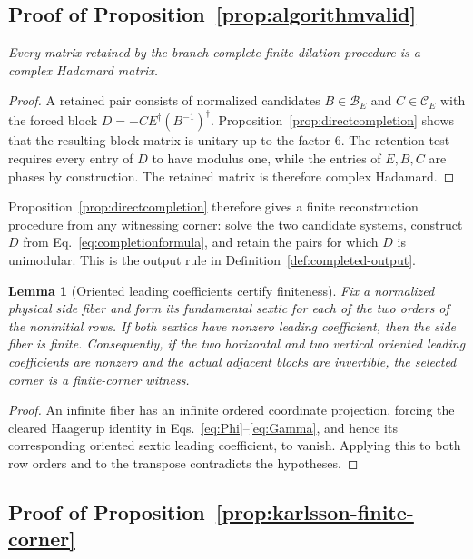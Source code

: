 \documentclass[aps,prx,reprint,nofootinbib,twoside,superscriptaddress,longbibliography,floatfix]{revtex4-2}
\newtheorem{lemma}[theorem]{Lemma}
\theoremstyle{definition}
\begin{document}
\subsection{{Proof of Proposition~\ref{prop:algorithmvalid}}}
{\emph{Every matrix retained by the branch-complete finite-dilation procedure is a complex Hadamard matrix.}}

\begin{proof}
{A retained pair consists of normalized candidates $B\in\mathcal B_E$ and $C\in\mathcal C_E$ with the forced block $D=-CE^\dagger(B^{-1})^\dagger$. Proposition~\ref{prop:directcompletion} shows that the resulting block matrix is unitary up to the factor $6$. The retention test requires every entry of $D$ to have modulus one, while the entries of $E,B,C$ are phases by construction. The retained matrix is therefore complex Hadamard.}
\end{proof}

{Proposition~\ref{prop:directcompletion} therefore gives a finite reconstruction procedure from any witnessing corner: solve the two candidate systems, construct $D$ from Eq.~\eqref{eq:completionformula}, and retain the pairs for which $D$ is unimodular. This is the output rule in Definition~\ref{def:completed-output}.}

\begin{lemma}[Oriented leading coefficients certify finiteness]
\label{lem:supp-oriented-leading-finiteness}
Fix a normalized physical side fiber and form its fundamental sextic for each of the two orders of the noninitial rows. If both sextics have nonzero leading coefficient, then the side fiber is finite. Consequently, if the two horizontal and two vertical oriented leading coefficients are nonzero and the actual adjacent blocks are invertible, the selected corner is a finite-corner witness.
\end{lemma}

\begin{proof}
{An infinite fiber has an infinite ordered coordinate projection, forcing the cleared Haagerup identity in Eqs.~\eqref{eq:Phi}--\eqref{eq:Gamma}, and hence its corresponding oriented sextic leading coefficient, to vanish.  Applying this to both row orders and to the transpose contradicts the hypotheses.}
\end{proof}

\subsection{{Proof of Proposition~\ref{prop:karlsson-finite-corner}}}
\label{sec:supp-karlsson-witnesses}
\end{document}
